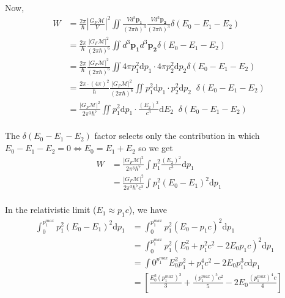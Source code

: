\documentclass{article}
\begin{document}
\begin{enumerate}[label=(\alph*)]
  Now, 
  \begin{align*}
    W &= \frac{2\pi}{\hbar} \left|\frac{G_F \mathcal{M}}{V}\right|^2 \iint \frac{V d^3 \mathbf{p_1}}{(2\pi \hbar)^3} \frac{V d^3 \mathbf{p_2}}{(2\pi \hbar)^3} \delta\left(E_0 - E_1 - E_2\right) \\
    &= \frac{2\pi}{\hbar} \frac{\left|G_F \mathcal{M}\right|^2}{(2\pi \hbar)^6} \iint d^3 \mathbf{p_1}d^3 \mathbf{p_2}  \delta\left(E_0 - E_1 - E_2\right) \\
    &= \frac{2\pi}{\hbar} \frac{\left|G_F \mathcal{M}\right|^2}{(2\pi \hbar)^6} \iint 4\pi p_1^2 \mathrm{d}p_1 \cdot  4\pi p_2^2 \mathrm{d}p_2   \delta\left(E_0 - E_1 - E_2\right) \\
    &= \frac{2\pi \cdot (4\pi)^2}{\hbar} \frac{\left|G_F \mathcal{M}\right|^2}{(2\pi \hbar)^6} \iint p_1^2 \mathrm{d}p_1 \cdot p_2^2 \mathrm{d}p_2 \;\; \delta\left(E_0 - E_1 - E_2\right) \\
    &= \frac{\left|G_F \mathcal{M}\right|^2}{2 \pi^3 \hbar^7} \iint p_1^2 \mathrm{d}p_1 \cdot \frac{(E_2)^2}{c^3} \mathrm{d} E_2 \;\; \delta\left(E_0 - E_1 - E_2\right) \\
  \end{align*}

  The $\delta(E_0 - E_1 - E_2)$ factor selects only the contribution in which $E_0 - E_1 - E_2 = 0 \iff E_0 = E_1 + E_2$ so we get 
  \begin{align*}
    W &= \frac{\left|G_F \mathcal{M}\right|^2}{2 \pi^3 \hbar^7} \int p_1^2 \frac{(E_2)^2}{c^3} \mathrm{d}p_1 \\
    &= \frac{\left|G_F \mathcal{M}\right|^2}{2 \pi^3 \hbar^7 c^3} \int p_1^2 (E_0 - E_1)^2 \mathrm{d}p_1 \\
  \end{align*}

  In the relativistic limit ($E_1 \approx p_1c$), we have 
  \begin{align*}
    \int_0^{{p_1^{max}}} p_1^2 (E_0 - E_1)^2 \mathrm{d}p_1 &= \int_{0}^{p_1^{max}} p_1^2(E_0 - p_1c)^2 \mathrm{d}p_1 \\
    &= \int_{0}^{p_1^{max}} p_1^2(E_0^2 + p_1^2c^2 - 2E_0p_1c)^2 \mathrm{d}p_1 \\
    &= \int{0}^{p_1^{max}} E_0^2 p_1^2 + p_1^4 c^2 - 2E_0 p_1^3 c \mathrm{d}p_1 \\
    &= \left[\frac{E_0^2 \left(p_1^{max}\right)^3}{3} + \frac{\left(p_1^{max}\right)^5 c^2}{5} - 2E_0 \frac{\left(p_1^{max}\right)^4 c}{4} \right] \\
  \end{align*}


\end{enumerate}
\end{document}
